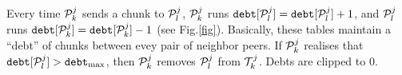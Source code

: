 Every time ${\cal P}^j_k$ sends a chunk to ${\cal P}^j_l$, ${\cal
P}^j_k$ runs $\mathtt{debt}[{\cal P}^j_l] = \mathtt{debt}[{\cal
P}^j_l]+1$, and ${\cal P}^j_l$ runs $\mathtt{debt}[{\cal P}^j_k]
= \mathtt{debt}[{\cal P}^j_k]-1$ (see Fig.\ref{fig}). Basically, these tables
maintain a ``debt'' of chunks between evey pair of neighbor
peers. If ${\cal P}^j_k$ realises that $\mathtt{debt}[{\cal
P}^j_l]>\mathtt{debt}_\text{max}$, then ${\cal P}^j_k$ removes ${\cal
P}^j_l$ from ${\cal T}^j_k$. Debts are clipped to $0$.

\begin{comment}
In each round, peers check if a chunk have been received from the rest
of peers of the team (${\cal P}_k\in {\cal T}_j)$). If not, peers send
a $[\mathtt{propagate}~{\cal P}_i]$ to one or more (possibly
to the rest of) peers of the team, where ${\cal P}_i$ is the origin peer
of the missing chunk. At this point, the process continues as
described in Section~\ref{dbs:chunk_flooding}.
\end{comment}

\begin{comment}
For each ${\cal P}_k\in N({\cal P}_i)$, ${\cal P}_i$ checks if a chunk
has been received from ${\cal P}_k$. If ${\cal P}_i$ detects that
${\cal P}_k$ has not sent a chunk to it during $L$ consecutive rounds,
performs $N({\cal P}_i) = N({\cal P}_i)\setminus{\cal P}_k$, and stops
sending to ${\cal P}_k$ more chunks.
\end{comment}
\begin{comment}
computes a
``chunk-debt'', denoted by $d({\cal P}_k)$, that is incremented each
time a chunk is received from ${\cal P}_k$ and decremented each time a
chunk is sent to ${\cal P}_k$. If ${\cal P}_i$ verifies that $d({\cal
  P}_k)>D$ (the maximum debt), then ${\cal P}_i$ considers that ${\cal
  P}_k$ is unable to communicate with it, performs $N({\cal P}_i) =
N({\cal P}_i)\setminus{\cal P}_k$, and stops sending to ${\cal P}_k$
more chunks.
\end{comment}
